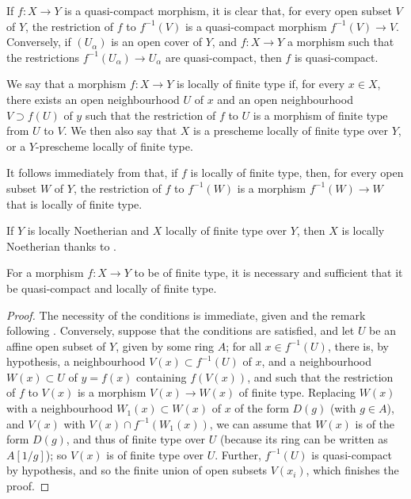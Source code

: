 If $f: X\to Y$ is a quasi-compact morphism, it is clear that, for every open subset $V$ of $Y$, the restriction of $f$ to $f^{-1}(V)$ is a quasi-compact morphism $f^{-1}(V)\to V$.
Conversely, if $(U_\alpha)$ is an open cover of $Y$, and $f: X\to Y$ a morphism such that the restrictions $f^{-1}(U_\alpha)\to U_\alpha$ are quasi-compact, then $f$ is quasi-compact.

\begin{defn}[6.6.2]
\label{1.6.6.2}
We say that a morphism $f: X\to Y$ is locally of finite type if, for every $x\in X$, there exists an open neighbourhood $U$ of $x$ and an open neighbourhood $V\supset f(U)$ of $y$ such that the restriction of $f$ to $U$ is a morphism of finite type from $U$ to $V$.
We then also say that $X$ is a prescheme locally of finite type over $Y$, or a $Y$-prescheme locally of finite type.
\end{defn}

It follows immediately from  that, if $f$ is locally of finite type, then, for every open subset $W$ of $Y$, the restriction of $f$ to $f^{-1}(W)$ is a morphism $f^{-1}(W)\to W$ that is locally of finite type.

If $Y$ is locally Noetherian and $X$ locally of finite type over $Y$, then $X$ is locally Noetherian thanks to .

\begin{prop}[6.6.3]
\label{1.6.6.3}
For a morphism $f: X\to Y$ to be of finite type, it is necessary and sufficient that it be quasi-compact and locally of finite type.
\end{prop}

\begin{proof}
\label{proof-1.6.6.3}
The necessity of the conditions is immediate, given  and the remark following .
Conversely, suppose that the conditions are satisfied, and let $U$ be an affine open subset of $Y$, given by some ring $A$;
for all $x\in f^{-1}(U)$, there is, by hypothesis, a neighbourhood $V(x)\subset f^{-1}(U)$ of $x$, and a neighbourhood $W(x)\subset U$ of $y=f(x)$ containing $f(V(x))$, and such that the restriction of $f$ to $V(x)$ is a morphism $V(x)\to W(x)$ of finite type.
Replacing $W(x)$ with a neighbourhood $W_1(x)\subset W(x)$ of $x$ of the form $D(g)$ (with $g\in A$), and $V(x)$ with $V(x)\cap f^{-1}(W_1(x))$, we can assume that $W(x)$ is of the form $D(g)$, and thus of finite type over $U$ (because its ring can be written as $A[1/g]$);
so $V(x)$ is of finite type over $U$.
Further, $f^{-1}(U)$ is quasi-compact by hypothesis, and so the finite union of open subsets $V(x_i)$, which finishes the proof.
\end{proof}

